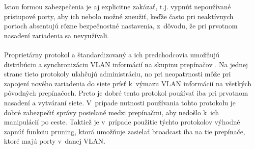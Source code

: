 \noindent
Istou formou zabezpečenia je aj explicitne zakázať, t.j. vypnúť nepoužívané prístupové porty, aby ich nebolo možné zneužiť, keďže často pri neaktívnych portoch absentujú rôzne bezpečnostné nastavenia, z~dôvodu, že pri prvotnom nasadení zariadenia sa nevyužívali.  
\\\\   
\noindent
Proprietárny protokol  a štandardizovaný  a ich predchodcovia umožňujú distribúciu a synchronizáciu VLAN informácií na skupinu prepínačov \cite{Vyncke2008}. Na jednej strane tieto protokoly uľahčujú administráciu, no pri neopatrnosti môže pri zapojení nového zariadenia do siete prísť k~výmazu VLAN informácií na všetkých pôvodných prepínačoch. Preto je dobré tento protokol používať iba pri prvotnom nasadení a vytváraní siete. V~prípade nutnosti používania tohto protokolu je dobré zabezpečiť správy posielané medzi prepínačmi, aby nedošlo k~ich manipulácií po ceste. Taktiež je v~prípade použitie týchto protokolov výhodné zapnúť funkciu pruning, ktorá umožňuje zasielať broadcast iba na tie prepínače, ktoré majú porty v~danej VLAN. 


